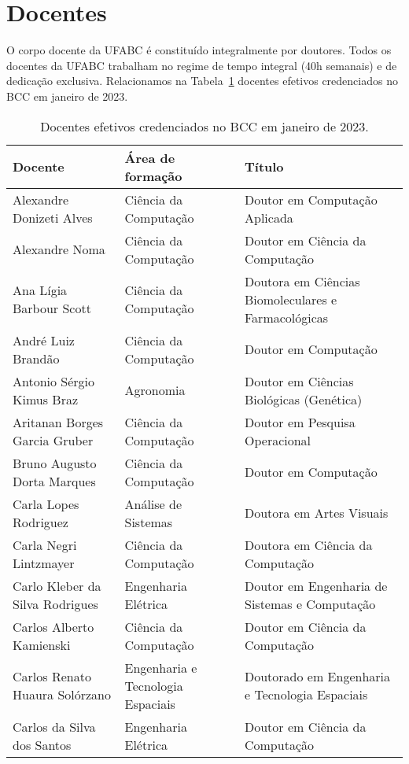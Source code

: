 \section{Docentes}
\label{sec:docentes}

O corpo docente da UFABC é constituído integralmente por doutores.
Todos os docentes da UFABC trabalham no regime de tempo integral (40h semanais)
e de dedicação exclusiva.
Relacionamos na Tabela~\ref{tab:docentes} docentes efetivos credenciados no BCC em janeiro de
2023.

{\small
\begin{longtable}{|p{}|p{}|p{}|}
    \caption{Docentes efetivos credenciados no BCC em janeiro de 2023.}
    \label{tab:docentes}
    \endfirsthead
    \endhead

    \hline
    \textbf{Docente} & \textbf{Área de formação} & \textbf{Título} \\
    \hline\hline
    Alexandre Donizeti Alves & Ciência da Computação & Doutor em Computação Aplicada \\
    Alexandre Noma & Ciência da Computação & Doutor em Ciência da Computação \\
    Ana Lígia Barbour Scott & Ciência da Computação & Doutora em Ciências Biomoleculares e Farmacológicas \\
    André Luiz Brandão & Ciência da Computação & Doutor em Computação \\
    Antonio Sérgio Kimus Braz & Agronomia & Doutor em Ciências Biológicas (Genética) \\
    Aritanan Borges Garcia Gruber & Ciência da Computação & Doutor em Pesquisa Operacional \\
    Bruno Augusto Dorta Marques & Ciência da Computação & Doutor em Computação \\
    Carla Lopes Rodriguez & Análise de Sistemas & Doutora em Artes Visuais \\
    Carla Negri Lintzmayer & Ciência da Computação & Doutora em Ciência da Computação \\
    Carlo Kleber da Silva Rodrigues & Engenharia Elétrica & Doutor em Engenharia de Sistemas e Computação \\
    Carlos Alberto Kamienski & Ciência da Computação & Doutor em Ciência da Computação \\
    Carlos Renato Huaura Solórzano & Engenharia e Tecnologia Espaciais & Doutorado em Engenharia e Tecnologia Espaciais \\
    Carlos da Silva dos Santos & Engenharia Elétrica & Doutor em Ciência da Computação \\

\end{longtable}}
